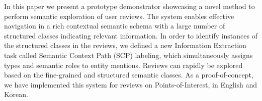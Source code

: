 In this paper we present a prototype demonstrator showcasing a novel method to perform semantic exploration of user reviews.  The system enables effective navigation in a rich contextual semantic schema with a large number of structured classes indicating relevant information. In order to identify instances of the structured classes in the reviews, we defined a new Information Extraction task called Semantic Context Path (SCP) labeling, which simultaneously assigns types and semantic roles to entity mentions.  Reviews can rapidly be explored based on the fine-grained and structured semantic classes. As a proof-of-concept, we have implemented this system for reviews on Points-of-Interest, in English and Korean.